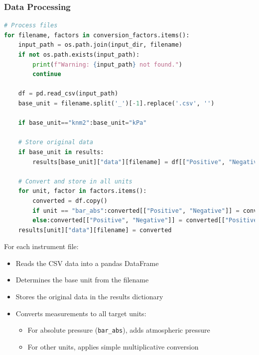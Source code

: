 \documentclass{article}
\begin{document}
\subsubsection{Data Processing}\vspace{-0.5em}
\begin{lstlisting}[language=Python]
# Process files
for filename, factors in conversion_factors.items():	
	input_path = os.path.join(input_dir, filename)
	if not os.path.exists(input_path):
		print(f"Warning: {input_path} not found.")
		continue
	
	df = pd.read_csv(input_path)
	base_unit = filename.split('_')[-1].replace('.csv', '')
	
	if base_unit=="knm2":base_unit="kPa"
	
	# Store original data
	if base_unit in results:
		results[base_unit]["data"][filename] = df[["Positive", "Negative"]]

	# Convert and store in all units
	for unit, factor in factors.items():
		converted = df.copy()
		if unit == "bar_abs":converted[["Positive", "Negative"]] = converted[["Positive", "Negative"]] * factor + ATM_PRESSURE_BAR
		else:converted[["Positive", "Negative"]] = converted[["Positive", "Negative"]] * factor
	results[unit]["data"][filename] = converted
\end{lstlisting}

For each instrument file:
\begin{itemize}[itemsep=-1mm]
	\item Reads the CSV data into a pandas DataFrame
	\item Determines the base unit from the filename
	\item Stores the original data in the results dictionary
	\item Converts measurements to all target units:
	\begin{itemize}
		\item For absolute pressure (\texttt{bar\_abs}), adds atmospheric pressure
		\item For other units, applies simple multiplicative conversion
	\end{itemize}
\end{itemize}
\end{document}
